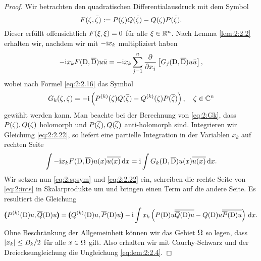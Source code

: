 \begin{proof}
Wir betrachten den quadratischen Differentialausdruck mit dem Symbol
\begin{equation}\label{eq:2:spsym}
F(\zeta,\bar{\zeta}):=P(\zeta)Q(\bar{\zeta})-Q(\zeta)P(\bar{\zeta}).
\end{equation}
Dieser erfüllt offensichtlich $F(\xi,\xi)=0$ für alle $\xi\in\mathbb R^n$.
Nach Lemma \ref{lem:2:2.2} erhalten wir,
nachdem wir mit $-\mathrm i x_k$ multipliziert haben
\begin{equation}\label{eq:2:2.22}
-\mathrm i x_kF(\mathrm D,\overline{\mathrm D})u\bar{u}=-\mathrm i x_k\sum_{j=1}^n\frac{\partial}{\partial x_j}\left[G_j(\mathrm D,\overline{\mathrm D})u\bar{u}\right],
\end{equation}
wobei nach Formel \eqref{eq:2:2.16} das Symbol
\begin{equation}
G_k(\zeta,\zeta)=-\mathrm i\left(P^{(k)}(\zeta)Q(\overline{\zeta})-Q^{(k)}(\zeta)P(\overline{\zeta})\right)\label{eq:2:Gk},
\quad\zeta\in\mathbb C^n
\end{equation}
gewählt werden kann.
Man beachte bei der Berechnung von \eqref{eq:2:Gk},
dass $P(\zeta),Q(\zeta)$ holomorph
und $P(\overline{\zeta}),Q(\overline{\zeta})$ anti-holomorph sind.
Integrieren wir Gleichung \eqref{eq:2:2.22},
so liefert eine partielle Integration
in der Variablen $x_k$ auf rechten Seite
\begin{equation}\label{eq:2:ints}
\int-\mathrm i x_kF(\mathrm D,\overline{\mathrm D})u(x)\overline{u(x)}\,\mathrm d x=\mathrm i\int G_k(\mathrm D,\overline{\mathrm D})u(x)\overline{u(x)}\,\mathrm d x.
\end{equation}
Wir setzen nun \eqref{eq:2:spsym} und \eqref{eq:2:2.22} ein,
schreiben die rechte Seite von \eqref{eq:2:ints}
in Skalarprodukte um und bringen einen Term auf die andere Seite.
Es resultiert die Gleichung
\begin{equation}
\pmb(P^{(k)}(\mathrm D)u,\overline{Q}(\mathrm D)u\pmb)
=\pmb(Q^{(k)}(\mathrm D)u,\overline{P}(\mathrm D)u\pmb)-\mathrm i\int x_k\left(P(\mathrm D)u\overline{\overline{Q}(\mathrm D)u}-Q(\mathrm D)u\overline{\overline{P}(\mathrm D)u}\right)\,\mathrm d x.
\end{equation}
Ohne Beschränkung der Allgemeinheit können wir das Gebiet $\Omega$ so legen,
dass $\lvert x_k\rvert\leq B_k/2$ für alle $x\in\Omega$ gilt.
Also erhalten wir mit Cauchy-Schwarz
und der Dreiecksungleichung die Ungleichung \eqref{eq:lem:2:2.4}.
\end{proof}

